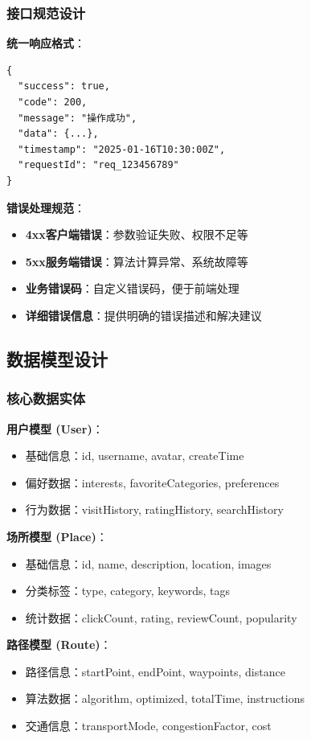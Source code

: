 \documentclass[12pt,a4paper]{article}
\begin{document}
\subsubsection{接口规范设计}

\textbf{统一响应格式}：
\begin{verbatim}
{
  "success": true,
  "code": 200,
  "message": "操作成功",
  "data": {...},
  "timestamp": "2025-01-16T10:30:00Z",
  "requestId": "req_123456789"
}
\end{verbatim}

\textbf{错误处理规范}：
\begin{itemize}
    \item \textbf{4xx客户端错误}：参数验证失败、权限不足等
    \item \textbf{5xx服务端错误}：算法计算异常、系统故障等
    \item \textbf{业务错误码}：自定义错误码，便于前端处理
    \item \textbf{详细错误信息}：提供明确的错误描述和解决建议
\end{itemize}

\subsection{数据模型设计}

\subsubsection{核心数据实体}

\begin{solutionbox}[title={核心数据模型架构}]
\textbf{用户模型 (User)}：
\begin{itemize}[nosep]
    \item 基础信息：id, username, avatar, createTime
    \item 偏好数据：interests, favoriteCategories, preferences
    \item 行为数据：visitHistory, ratingHistory, searchHistory
\end{itemize}

\textbf{场所模型 (Place)}：
\begin{itemize}[nosep]
    \item 基础信息：id, name, description, location, images
    \item 分类标签：type, category, keywords, tags
    \item 统计数据：clickCount, rating, reviewCount, popularity
\end{itemize}

\textbf{路径模型 (Route)}：
\begin{itemize}[nosep]
    \item 路径信息：startPoint, endPoint, waypoints, distance
    \item 算法数据：algorithm, optimized, totalTime, instructions
    \item 交通信息：transportMode, congestionFactor, cost
\end{itemize}
\end{solutionbox}
\end{document}
